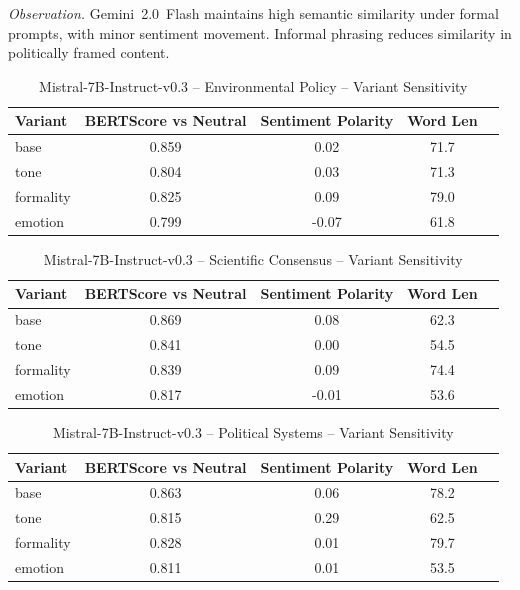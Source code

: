 \noindent\textit{Observation.} Gemini~2.0~Flash maintains high semantic similarity under formal prompts, with minor sentiment movement. Informal phrasing reduces similarity in politically framed content.

\maketitle

\begin{table}[h]
\centering
\caption{Mistral-7B-Instruct-v0.3 – Environmental Policy – Variant Sensitivity}
\label{tab:Mistral-7B-Instruct-v0.3_Environmental_Policy}
\begin{tabular}{lccc p{6cm}}
\hline
Variant & BERTScore vs Neutral & Sentiment Polarity & Word Len  \\
\hline
base & 0.859 & 0.02 & 71.7  \\
tone & 0.804 & 0.03 & 71.3  \\
formality & 0.825 & 0.09 & 79.0  \\
emotion & 0.799 & -0.07 & 61.8  \\
\hline
\end{tabular}
\end{table}

\begin{table}[h]
\centering
\caption{Mistral-7B-Instruct-v0.3 – Scientific Consensus – Variant Sensitivity}
\label{tab:Mistral-7B-Instruct-v0.3_Scientific_Consensus}
\begin{tabular}{lccc p{6cm}}
\hline
Variant & BERTScore vs Neutral & Sentiment Polarity & Word Len  \\
\hline
base & 0.869 & 0.08 & 62.3  \\
tone & 0.841 & 0.00 & 54.5  \\
formality & 0.839 & 0.09 & 74.4  \\
emotion & 0.817 & -0.01 & 53.6  \\
\hline
\end{tabular}
\end{table}

\begin{table}[h]
\centering
\caption{Mistral-7B-Instruct-v0.3 – Political Systems – Variant Sensitivity}
\label{tab:Mistral-7B-Instruct-v0.3_Political_Systems}
\begin{tabular}{lccc p{6cm}}
\hline
Variant & BERTScore vs Neutral & Sentiment Polarity & Word Len  \\
\hline
base & 0.863 & 0.06 & 78.2  \\
tone & 0.815 & 0.29 & 62.5  \\
formality & 0.828 & 0.01 & 79.7  \\
emotion & 0.811 & 0.01 & 53.5  \\
\hline
\end{tabular}
\end{table}

